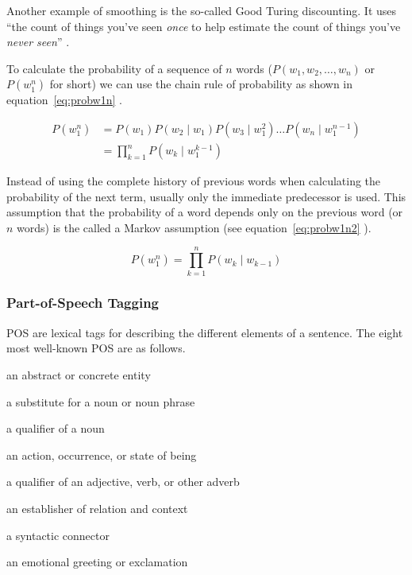 Another example of smoothing is the so-called Good Turing discounting. It uses ``the count of things you've seen \textit{once} to help estimate the count of things you've \textit{never seen}'' \autocite[their emphasis]{Jurafsky2009}.

\spirals

To calculate the probability of a sequence of $n$ words ($P(w_1,w_2,\ldots,w_n)$ or $P(w_1^n)$ for short) we can use the chain rule of probability as shown in equation~\ref{eq:probw1n}\marginnote{$\bm{\Sigma}$~\ref{eq:probw1n}} \autocite{Jurafsky2009}.

\begin{equation}
  \begin{split}
  P(w_1^n) &= P(w_1)P(w_2 \mid w_1)P(w_3 \mid w_1^2 ) \ldots P(w_n \mid w_1^{n-1})\\
  &= \prod_{k=1}^{n}P(w_k \mid w_1^{k-1})
  \end{split}
  \label{eq:probw1n}
\end{equation}

Instead of using the complete history of previous words when calculating the probability of the next term, usually only the immediate predecessor is used. This assumption that the probability of a word depends only on the previous word (or $n$ words) is the called a Markov assumption (see equation~\ref{eq:probw1n2}\marginnote{$\bm{\Sigma}$~\ref{eq:probw1n2}} \autocite{Jurafsky2009}).

\begin{equation}
  P(w_1^n) = \prod_{k=1}^{n}P(w_k \mid w_{k-1})
  \label{eq:probw1n2}
\end{equation}


\subsubsection{Part-of-Speech Tagging}
\label{s:pos}

\ac{POS} are lexical tags for describing the different elements of a sentence. The eight most well-known \ac{POS} are as follows.

\begin{description}[leftmargin=2.75cm]
  \item [Noun] an abstract or concrete entity
  \item [Pronoun] a substitute for a noun or noun phrase
  \item [Adjective] a qualifier of a noun
  \item [Verb] an action, occurrence, or state of being
  \item [Adverb] a qualifier of an adjective, verb, or other adverb
  \item [Preposition] an establisher of relation and context
  \item [Conjunction] a syntactic connector
  \item [Interjection] an emotional greeting or exclamation
\end{description}

